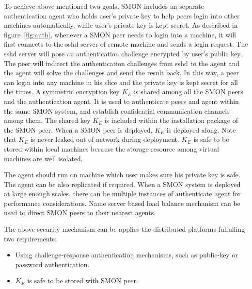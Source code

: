 To achieve above-mentioned two goals, SMON includes an
separate authentication agent who holds user's private key
to help peers login into other machines automatically, while
user's private key is kept secret. As described in
figure~\ref{fig:auth}, whenever a SMON peer needs to login
into a machine, it will first connects to the sshd server of
remote machine and sends a login request. The sshd server
will pose an authentication challenge encrypted by user's
public key. The peer will indirect the authentication
challenges from sshd to the agent and the agent will solve
the challenges and send the result back. In this way, a peer
can login into any machine in his slice and the private key
is kept secret for all the times. A symmetric encryption key
$K_E$ is shared among all the SMON peers and the
authentication agent. It is used to authenticate peers and
agent within the same SMON system, and establish
confidential communication channels among them. The shared
key $K_E$ is included within the installation package of the
SMON peer. When a SMON peer is deployed, $K_E$ is deployed
along. Note that $K_E$ is never leaked out of network during
deployment. $K_E$ is safe to be stored within local machines
because the storage resource among virtual machines are well
isolated.


The agent should run on machine which user makes sure his
private key is safe. The agent can be also replicated if
required. When a SMON system is deployed at large enough
scales, there can be multiple instances of authenticate
agent for performance considerations. Name server based load
balance mechanism\cite{xxx} can be used to direct SMON peers to
their nearest agents.

The above security mechanism can be applies the distributed
platforms fulfulling two requirements:

\begin{itemize}

  \item Using challenge-response authentication mechanisms,
  such as public-key or password authentication.

  \item $K_E$ is safe to be stored with SMON peer.

\end{itemize}

